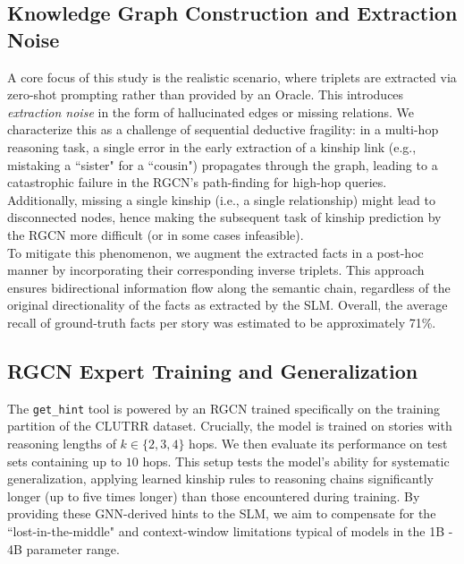 \documentclass[
]{ceurart}
\begin{document}
\subsection{Knowledge Graph Construction and Extraction Noise}
A core focus of this study is the realistic scenario, where triplets are extracted via zero-shot prompting rather than provided by an Oracle. This introduces \textit{extraction noise} in the form of hallucinated edges or missing relations. We characterize this as a challenge of sequential deductive fragility: in a multi-hop reasoning task, a single error in the early extraction of a kinship link (e.g., mistaking a ``sister" for a ``cousin") propagates through the graph, leading to a catastrophic failure in the RGCN's path-finding for high-hop queries. Additionally, missing a single kinship (i.e., a single relationship) might lead to disconnected nodes, hence making the subsequent task of kinship prediction by the RGCN more difficult (or in some cases infeasible).\\
To mitigate this phenomenon, we augment the extracted facts in a post-hoc manner by incorporating their corresponding inverse triplets. This approach ensures bidirectional information flow along the semantic chain, regardless of the original directionality of the facts as extracted by the SLM. Overall, the average recall of ground-truth facts per story was estimated to be approximately 71\%.

\subsection{RGCN Expert Training and Generalization}
The \texttt{get\_hint} tool is powered by an RGCN trained specifically on the training partition of the CLUTRR dataset. Crucially, the model is trained on stories with reasoning lengths of $k \in \{2, 3, 4\}$ hops. We then evaluate its performance on test sets containing up to $10$ hops. This setup tests the model's ability for systematic generalization, applying learned kinship rules to reasoning chains significantly longer (up to five times longer) than those encountered during training. By providing these GNN-derived hints to the SLM, we aim to compensate for the ``lost-in-the-middle" and context-window limitations typical of models in the 1B - 4B parameter range.
\end{document}
